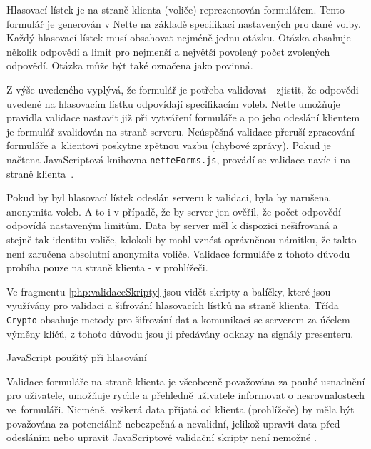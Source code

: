 Hlasovací lístek je na straně klienta (voliče) reprezentován formulářem. Tento formulář je generován v Nette na základě specifikací nastavených pro dané volby. Každý hlasovací lístek musí obsahovat nejméně jednu otázku. Otázka obsahuje několik odpovědí a limit pro nejmenší a největší povolený počet zvolených odpovědí. Otázka může být také označena jako povinná.

Z výše uvedeného vyplývá, že formulář je potřeba validovat - zjistit, že odpovědi uvedené na hlasovacím lístku odpovídají specifikacím voleb. Nette umožňuje pravidla validace nastavit již při vytváření formuláře a po jeho odeslání klientem je formulář zvalidován na straně serveru. Neúspěšná validace přeruší zpracování formuláře a~klientovi poskytne zpětnou vazbu (chybové zprávy). Pokud je načtena JavaScriptová knihovna \texttt{netteForms.js}, provádí se validace navíc i na straně klienta~\cite{NetteForms}.

Pokud by byl hlasovací lístek odeslán serveru k validaci, byla by narušena anonymita voleb. A to i v případě, že by server jen ověřil, že počet odpovědí odpovídá nastaveným limitům. Data by server měl k dispozici nešifrovaná a stejně tak identitu voliče, kdokoli by mohl vznést oprávněnou námitku, že takto není zaručena absolutní anonymita voliče. Validace formuláře z tohoto důvodu probíha pouze na straně klienta - v prohlížeči.

Ve fragmentu \ref{php:validaceSkripty} jsou vidět skripty a balíčky, které jsou využívány pro validaci a šifrování hlasovacích lístků na straně klienta. Třída \texttt{Crypto} obsahuje metody pro šifrování dat a komunikaci se serverem za účelem výměny klíčů, z tohoto důvodu jsou ji předávány odkazy na signály presenteru.

\begin{listing}[ht]
\caption{JavaScript použitý při hlasování}
\label{php:validaceSkripty}
\end{listing}

\clearpage
{}\label{section:hlasovaniValidace}
Validace formuláře na straně klienta je všeobecně považována za pouhé usnadnění pro uživatele, umožňuje rychle a přehledně uživatele informovat o nesrovnalostech ve~formuláři. Nicméně, veškerá data přijatá od klienta (prohlížeče) by měla být považována za potenciálně nebezpečná a nevalidní, jelikož upravit data před odesláním nebo upravit JavaScriptové validační skripty není nemožné \cite{Sklar2018}\cite{Validace1}\cite{Validace2}\cite{Validace3}.

